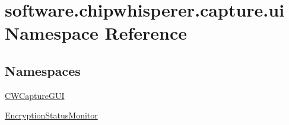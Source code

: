 \hypertarget{namespacesoftware_1_1chipwhisperer_1_1capture_1_1ui}{}\section{software.\+chipwhisperer.\+capture.\+ui Namespace Reference}
\label{namespacesoftware_1_1chipwhisperer_1_1capture_1_1ui}
\subsection*{Namespaces}
\begin{DoxyCompactItemize}
\item 
 \hyperlink{namespacesoftware_1_1chipwhisperer_1_1capture_1_1ui_1_1CWCaptureGUI}{C\+W\+Capture\+G\+U\+I}
\item 
 \hyperlink{namespacesoftware_1_1chipwhisperer_1_1capture_1_1ui_1_1EncryptionStatusMonitor}{Encryption\+Status\+Monitor}
\end{DoxyCompactItemize}
